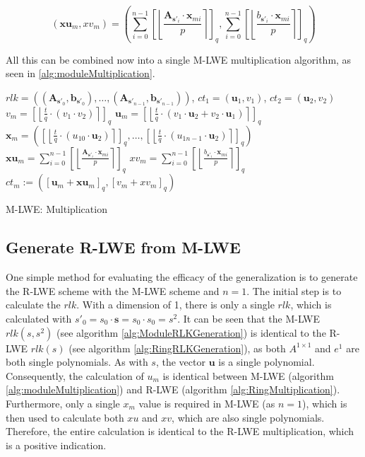 \begin{equation}
  (\textbf{xu}_m, xv_m) = \left(\sum_{i=0}^{n-1}\left[\left\lfloor\frac{\textbf{A}_{\textbf{s}'_i} \cdot \textbf{x}_{mi}}{p}  \right\rceil \right]_q, \sum_{i=0}^{n-1}\left[\left\lfloor \frac{b_{\textbf{s}'_i} \cdot \textbf{x}_{mi}}{p}  \right\rceil \right]_q\right)
  \label{eq:moduleXmSplitting}
\end{equation}

All this can be combined now into a single M-LWE multiplication algorithm, as seen in \ref{alg:moduleMultiplication}.

\begin{algorithm}[htb]
  \begin{algorithmic}[1]
    \REQUIRE $rlk=((\textbf{A}_{\textbf{s}'_0}, \textbf{b}_{\textbf{s}'_0}), \ldots ,(\textbf{A}_{\textbf{s}'_{n-1}}, \textbf{b}_{\textbf{s}'_{n-1}}))$, $ct_1 = (\textbf{u}_1, v_1)$, $ct_2 = (\textbf{u}_2, v_2)$
    \STATE $v_m = \left[\left\lfloor \frac{t}{q}\cdot (v_1 \cdot v_2)\right\rceil\right] _q $
    \STATE $\textbf{u}_m = \left[\left\lfloor \frac{t}{q}\cdot(v_1 \cdot \textbf{u}_2 + v_2 \cdot \textbf{u}_1)\right\rceil\right] _q$
    \STATE $\textbf{x}_m = \left(\left[\left\lfloor \frac{t}{q}\cdot(u_{10} \cdot \textbf{u}_2)\right\rceil\right]_q,\ldots, \left[\left\lfloor \frac{t}{q}\cdot(u_{1n-1} \cdot \textbf{u}_2)\right\rceil\right]_q\right) $
    \STATE $\textbf{xu}_m = \sum_{i=0}^{n-1}\left[\left\lfloor\frac{\textbf{A}_{\textbf{s}'_i} \cdot \textbf{x}_{mi}}{p}  \right\rceil \right]_q$
    \STATE $xv_m = \sum_{i=0}^{n-1}\left[\left\lfloor \frac{b_{\textbf{s}'_i} \cdot \textbf{x}_{mi}}{p}  \right\rceil \right]_q$
    \RETURN $ct_m:=(\left[\textbf{u}_m + \textbf{xu}_m\right]_q , \left[v_m + xv_m\right]_q )$
  \end{algorithmic}
  \caption{M-LWE: Multiplication}
  \label{alg:moduleMultiplication}
\end{algorithm}

\subsection*{Generate R-LWE from M-LWE}

One simple method for evaluating the efficacy of the generalization is to generate the R-LWE scheme with the M-LWE scheme and $n=1$. The initial step is to calculate the $rlk$. With a dimension of 1, there is only a single $rlk$, which is calculated with $s'_0 = s_0 \cdot \textbf{s} = s_0 \cdot s_0 = s^2$. It can be seen that the M-LWE $rlk(s, s^2)$ (see algorithm \ref{alg:ModuleRLKGeneration}) is identical to the R-LWE $rlk(s)$ (see algorithm \ref{alg:RingRLKGeneration}), as both $A^{1 \times 1}$ and $e^1$ are both single polynomials. As with $s$, the vector $\textbf{u}$ is a single polynomial. Consequently, the calculation of $u_m$ is identical between M-LWE (algorithm \ref{alg:moduleMultiplication}) and R-LWE (algorithm \ref{alg:RingMultiplication}). Furthermore, only a single $x_m$ value is required in M-LWE (as $n=1$), which is then used to calculate both $xu$ and $xv$, which are also single polynomials. Therefore, the entire calculation is identical to the R-LWE multiplication, which is a positive indication.



